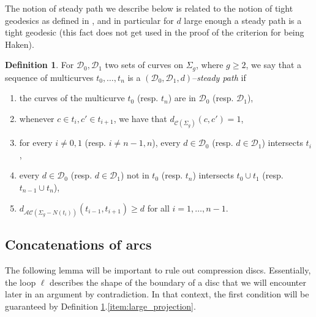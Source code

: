 \documentclass[11pt, oneside]{amsart}
\theoremstyle{definition}
\newtheorem{defn}[lemma]{Definition}
\theoremstyle{definition}
\newcommand{\calD} {\ensuremath {\mathcal{D}}}
\begin{document}
The notion of steady path we describe below is related to the notion of tight geodesics as defined in \cite{MasurMinsky:I}, and in particular for $d$ large enough a steady path is a tight geodesic (this fact does not get used in the proof of the criterion for being Haken).

\begin{defn}\label{defn:steadypath}
 For $\calD_0,\calD_1$ two sets of curves on $\Sigma_g$, where $g\geq 2$, we say that a sequence of multicurves $t_0,\dots,t_n$ is a $(\calD_0,\calD_1,d)$--\emph{steady path} if
\begin{enumerate}
\item the curves of the multicurve $t_0$ (resp. $t_n$) are in $\calD_0$ (resp. $\calD_1$),\label{item:endpoints}
\item whenever $c\in t_i,c'\in t_{i+1}$, we have that $d_{\mathcal C(\Sigma_g)}(c,c')=1$,\label{item:path}
\item for every $i\neq 0,1$ (resp. $i\neq n-1,n$), every $d\in \calD_0$ (resp. $d\in\calD_1$) intersects $t_i$,\label{item:filling}
\item every $d\in \calD_0$ (resp. $d\in\calD_1$) not in $t_0$ (resp. $t_n$) intersects $t_0\cup t_1$ (resp. $t_{n-1}\cup t_n$),\label{item:maximal}
 \item $d_{\mathcal{AC}(\Sigma_g-N(t_i))}(t_{i-1},t_{i+1})\geq d$ for all $i=1,\dots,n-1$.\label{item:large_projection}
\end{enumerate}

\end{defn}




\subsection{Concatenations of arcs}

The following lemma will be important to rule out compression discs. Essentially, the loop $\ell$ describes the shape of the boundary of a disc that we will encounter later in an argument by contradiction. In that context, the first condition will be guaranteed by Definition \ref{defn:steadypath}.\ref{item:large_projection}.
\end{document}
